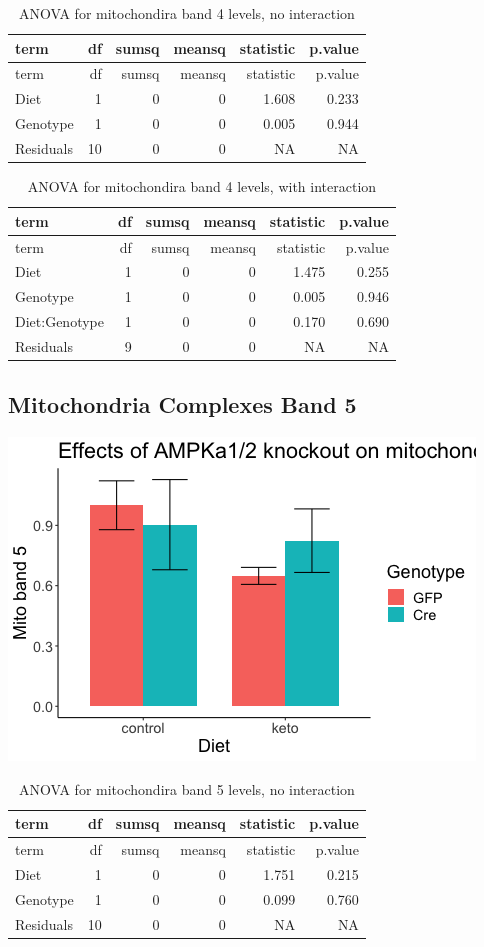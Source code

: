 \documentclass[
]{article}
\begin{document}
\begin{longtable}[]{@{}lrrrrr@{}}
\caption{ANOVA for mitochondira band 4 levels, no
interaction}\tabularnewline
\toprule
term & df & sumsq & meansq & statistic & p.value\tabularnewline
\midrule
\endfirsthead
\toprule
term & df & sumsq & meansq & statistic & p.value\tabularnewline
\midrule
\endhead
Diet & 1 & 0 & 0 & 1.608 & 0.233\tabularnewline
Genotype & 1 & 0 & 0 & 0.005 & 0.944\tabularnewline
Residuals & 10 & 0 & 0 & NA & NA\tabularnewline
\bottomrule
\end{longtable}

\begin{longtable}[]{@{}lrrrrr@{}}
\caption{ANOVA for mitochondira band 4 levels, with
interaction}\tabularnewline
\toprule
term & df & sumsq & meansq & statistic & p.value\tabularnewline
\midrule
\endfirsthead
\toprule
term & df & sumsq & meansq & statistic & p.value\tabularnewline
\midrule
\endhead
Diet & 1 & 0 & 0 & 1.475 & 0.255\tabularnewline
Genotype & 1 & 0 & 0 & 0.005 & 0.946\tabularnewline
Diet:Genotype & 1 & 0 & 0 & 0.170 & 0.690\tabularnewline
Residuals & 9 & 0 & 0 & NA & NA\tabularnewline
\bottomrule
\end{longtable}

\hypertarget{mitochondria-complexes-band-5}{%
\subsection{Mitochondria Complexes Band
5}\label{mitochondria-complexes-band-5}}

\includegraphics{figures/mitoband5-barplot-1.png}

\begin{longtable}[]{@{}lrrrrr@{}}
\caption{ANOVA for mitochondira band 5 levels, no
interaction}\tabularnewline
\toprule
term & df & sumsq & meansq & statistic & p.value\tabularnewline
\midrule
\endfirsthead
\toprule
term & df & sumsq & meansq & statistic & p.value\tabularnewline
\midrule
\endhead
Diet & 1 & 0 & 0 & 1.751 & 0.215\tabularnewline
Genotype & 1 & 0 & 0 & 0.099 & 0.760\tabularnewline
Residuals & 10 & 0 & 0 & NA & NA\tabularnewline
\bottomrule
\end{longtable}
\end{document}
